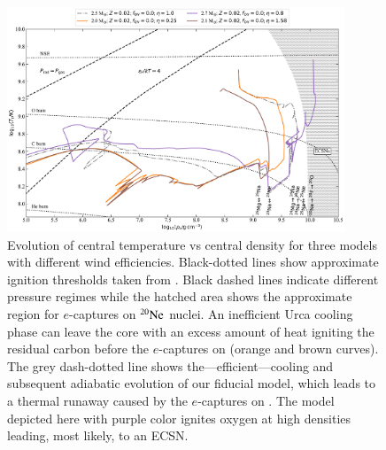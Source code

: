 \documentclass[main.tex]{subfiles}
\begin{document}
\begin{figure}[h!]
    \centering
    \includegraphics[width=0.9\textwidth]{figures/chapter2/RhoT/RhoT_series2_final.pdf}
    \caption{Evolution of central temperature vs central density for three \seriestwo models with different wind efficiencies. Black-dotted lines show approximate ignition thresholds taken from \mesa. Black dashed lines indicate different pressure regimes while the hatched area shows the approximate region for $e$-captures on $\rm ^{20}Ne$ nuclei. An inefficient Urca cooling phase can leave the core with an excess amount of heat igniting the residual carbon before the $e$-captures on  (orange and brown curves). The grey dash-dotted line shows the---efficient---cooling and subsequent adiabatic evolution of our \seriesone fiducial model, which leads to a thermal runaway caused by the $e$-captures on . The model depicted here with purple color ignites oxygen at high densities leading, most likely, to an ECSN.}
    \label{fig:rhot_series2}
\end{figure}
\end{document}
